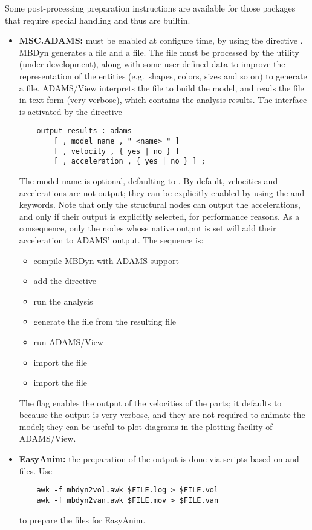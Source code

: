 \noindent
Some post-processing preparation instructions are available
for those packages that require special handling and thus
are builtin.
\begin{itemize}
\item \textbf{MSC.ADAMS:}
must be enabled at configure time, by using the directive
.
MBDyn generates a  file and a  file.
The  file must be processed by the utility  
(under development), along with some user-defined data to improve
the representation of the entities (e.g.\ shapes, colors, sizes
and so on) to generate a  file.
ADAMS/View interprets the  file to build the model,
and reads the  file in text form (very verbose),
which contains the analysis results.
The interface is activated by the directive
\begin{verbatim}
    output results : adams
        [ , model name , " <name> " ]
        [ , velocity , { yes | no } ]
        [ , acceleration , { yes | no } ] ;
\end{verbatim}
The model name is optional, defaulting to .
By default, velocities and accelerations are not output; they can be
explicitly enabled by using the  and 
keywords.
Note that only the  structural nodes can output 
the accelerations, and only if their output is explicitly selected,
for performance reasons.
As a consequence, only the nodes whose native output is set will add 
their acceleration to ADAMS' output.
The sequence is:
\begin{itemize}
\item compile MBDyn with ADAMS support
\item add the  directive
\item run the analysis
\item generate the  file from the resulting  file
\item run ADAMS/View
\item import the  file
\item import the  file
\end{itemize}
The  flag enables the output of the velocities 
of the parts; it defaults to  because the output 
is very verbose, and they are not required to animate
the model; they can be useful to plot diagrams in the plotting
facility of ADAMS/View.

\item \textbf{EasyAnim:}
the preparation of the output is done via  scripts
based on  and  files.
Use
\begin{verbatim}
    awk -f mbdyn2vol.awk $FILE.log > $FILE.vol
    awk -f mbdyn2van.awk $FILE.mov > $FILE.van
\end{verbatim}
to prepare the files for EasyAnim.


\end{itemize}
